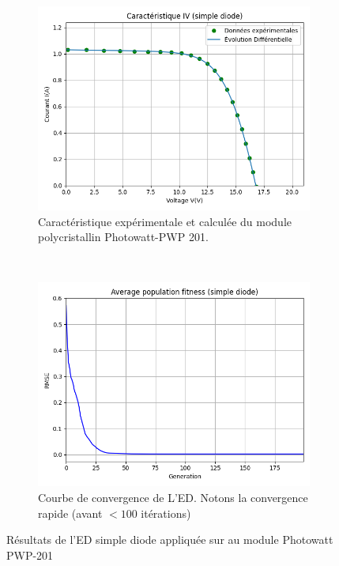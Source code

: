 \begin{figure}
    \centering
    \begin{subfigure}[b]{0.45\textwidth}
        \includegraphics[width=\textwidth]{resources/pwp/iv.png}
        \caption{Caractéristique expérimentale et calculée du module polycristallin Photowatt-PWP 201.}
    \end{subfigure}
    ~
    \begin{subfigure}[b]{0.45\textwidth}
        \includegraphics[width=\textwidth]{resources/pwp/fitness.png}
        \caption{Courbe de convergence de L'ED. Notons la convergence rapide (avant $< 100$ itérations)}
    \end{subfigure}
    \caption{Résultats de l'ED simple diode appliquée sur au module Photowatt PWP-201}
    \label{fig:pwpsingle}
\end{figure}%
